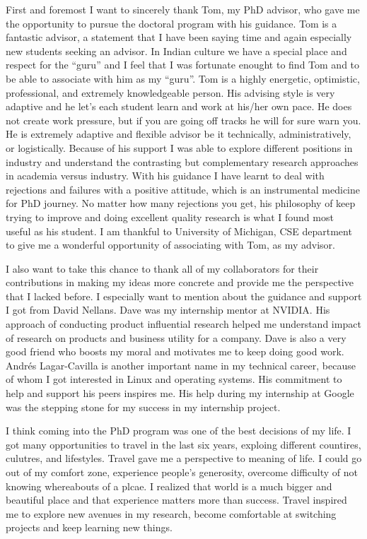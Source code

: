 First and foremost I want to sincerely thank Tom, my PhD advisor, who gave me the
opportunity to pursue the doctoral program with his guidance. Tom is a fantastic
advisor, a statement that I have been saying time and again especially new
students seeking an advisor. In Indian culture we have a special place and
respect for the ``guru'' and I feel that I was fortunate enought to find Tom and
to be able to associate with him as my ``guru''. Tom is a highly energetic,
optimistic, professional, and extremely knowledgeable person. His advising style
is very adaptive and he let's each student learn and work at his/her own pace.
He does not create work pressure, but if you are going off tracks he will for
sure warn you. He is extremely adaptive and flexible advisor be it technically,
administratively, or logistically. Because of his support I was able to explore
different positions in industry and understand the contrasting but complementary
research approaches in academia versus industry. With his guidance I have learnt
to deal with rejections and failures with a positive attitude, which is an
instrumental medicine for PhD journey. No matter how many rejections you get,
his philosophy of keep trying to improve and doing excellent quality research is
what I found most useful as his student. I am thankful to University of
Michigan, CSE department to give me a wonderful opportunity of associating with
Tom, as my advisor.

I also want to take this chance to thank all of my collaborators for their
contributions in making my ideas more concrete and provide me the perspective
that I lacked before. I especially want to mention about the guidance and
support I got from David Nellans. Dave was my internship mentor at NVIDIA.  His
approach of conducting product influential research helped me understand impact
of research on products and business utility for a company.  Dave is also a very
good friend who boosts my moral and motivates me to keep doing good work.
Andr\'es Lagar-Cavilla is another important name in my technical career,
because of whom I got interested in Linux and operating systems. His commitment
to help and support his peers inspires me. His help during my internship at
Google was the stepping stone for my success in my internship project.

I think coming into the PhD program was one of the best decisions of my life. I
got many opportunities to travel in the last six years, exploing different
countires, culutres, and lifestyles. Travel gave me a perspective to meaning of
life. I could go out of my comfort zone, experience people's generosity,
overcome difficulty of not knowing whereabouts of a plcae. I realized that world
is a much bigger and beautiful place and that experience matters more than
success. Travel inspired me to explore new avenues in my research, become
comfortable at switching projects and keep learning new things.

